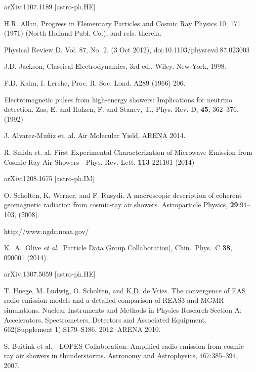 \begin{thebibliography}{1}


 arXiv:1107.1189 [astro-ph.HE]

 H.R. Allan, Progress in Elementary Particles and Cosmic Ray Physics 10, 171 (1971) (North Holland Publ. Co.), and refs. therein.

 Physical Review D, Vol. 87, No. 2. (3 Oct 2012), doi:10.1103/physrevd.87.023003 

 J.D. Jackson, Classical Electrodynamics, 3rd ed., Wiley, New York, 1998.

 F.D. Kahn, I. Lerche, Proc. R. Soc. Lond. A289 (1966) 206.

 Electromagnetic pulses from high-energy showers: Implications for neutrino detection, Zas, E. and Halzen, F. and Stanev, T., Phys. Rev. D, \textbf{45}, 362--376, (1992)

 J. Alvarez-Mu\~niz et. al. Air Molecular Yield, ARENA 2014.

 R. Smida et. al. First Experimental Characterization of Microwave Emission from Cosmic Ray Air Showers - Phys. Rev. Lett. \textbf{113} 221101 (2014)

 arXiv:1208.1675 [astro-ph.IM]


 O. Scholten, K. Werner, and F. Rusydi. A macroscopic description of coherent geomagnetic radiation from cosmic-ray air showers. Astroparticle Physics, {\bf 29}:94–103, (2008).

 http://www.ngdc.noaa.gov/

  K.~A.~Olive {\it et al.}  [Particle Data Group Collaboration],
  Chin.\ Phys.\ C {\bf 38}, 090001 (2014).

 arXiv:1307.5059 [astro-ph.HE]

 T. Huege, M. Ludwig, O. Scholten, and K.D. de Vries. The convergence of EAS radio emission models and a detailed comparison of REAS3 and MGMR simulations. Nuclear Instruments and Methods in Physics Research Section A: Accelerators, Spectrometers, Detectors and Associated Equipment, 662(Supplement 1):S179–S186, 2012. ARENA 2010.

 S. Buitink et al. - LOPES Collaboration. Amplified radio emission from cosmic ray air showers in thunderstorms. Astronomy and Astrophysics, 467:385–394, 2007.
 


\end{thebibliography}
